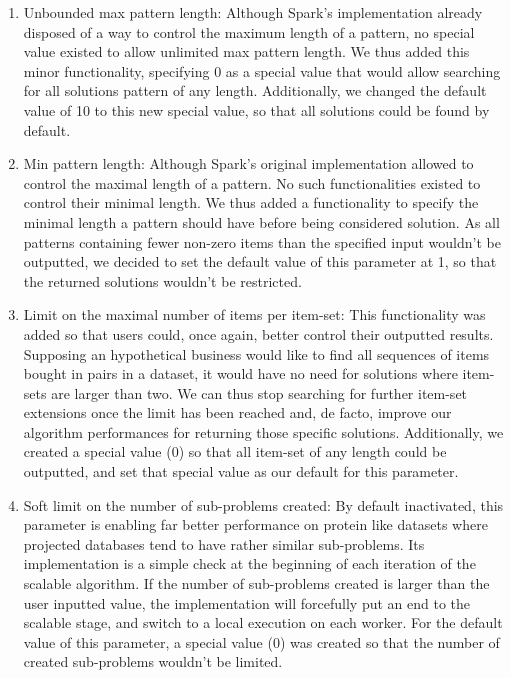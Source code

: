 \documentclass{eplmastersthesis}
\begin{document}
\begin{enumerate}
	\item Unbounded max pattern length: Although Spark's implementation already disposed of a way to control the maximum length of a pattern, no special value existed to allow unlimited max pattern length. We thus added this minor functionality, specifying 0 as a special value that would allow searching for all solutions pattern of any length. Additionally, we changed the default value of 10 to this new special value, so that all solutions could be found by default.
	\item Min pattern length: Although Spark's original implementation allowed to control the maximal length of a pattern. No such functionalities existed to control their minimal length. We thus added a functionality to specify the minimal length a pattern should have before being considered solution. As all patterns containing fewer non-zero items than the specified input wouldn't be outputted, we decided to set the default value of this parameter at 1, so that the returned solutions wouldn't be restricted.
	\item Limit on the maximal number of items per item-set: This functionality was added so that users could, once again, better control their outputted results. Supposing an hypothetical business would like to find all sequences of items bought in pairs in a dataset, it would have no need for solutions where item-sets are larger than two. We can thus stop searching for further item-set extensions once the limit has been reached and, de facto, improve our algorithm performances for returning those specific solutions. Additionally, we created a special value (0) so that all item-set of any length could be outputted, and set that special value as our default for this parameter.
	\item Soft limit on the number of sub-problems created: By default inactivated, this parameter is enabling far better performance on protein like datasets where projected databases tend to have rather similar sub-problems. Its implementation is a simple check at the beginning of each iteration of the scalable algorithm. If the number of sub-problems created is larger than the user inputted value, the implementation will forcefully put an end to the scalable stage, and switch to a local execution on each worker.
	For the default value of this parameter, a special value (0) was created so that the number of created sub-problems wouldn't be limited.\newline
	

\end{enumerate}
\end{document}
